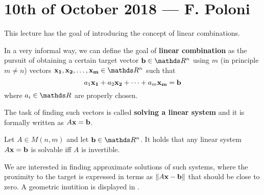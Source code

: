 \documentclass[computationalMathematics.tex]{subfiles}
\begin{document}
\chapter{10th of October 2018 --- F. Poloni}

This lecture has the goal of introducing the concept of linear combinations.

\begin{definition}
  In a very informal way, we can define the goal of \textbf{linear combination} as the pursuit of obtaining a certain target vector $\vect{b} \in \R^n$ using $m$ (in principle $m \neq n$) vectors $\vect{x_1}, \vect{x_2}, \ldots, \vect{x_m} \in \R^n$ such that
  \[
		a_1 {\bf x_1 } + a_2 {\bf x_2 } + \cdots + a_m {\bf x_m } = {\bf b }
  \]
  where $a_i \in \R$ are properly chosen.
\end{definition}

The task of finding such vectors is called \textbf{solving a linear system} and it is formally written as $A{\bf x }={\bf b }$.

\begin{theorem}
  Let $A \in M(n, m)$ and let $\vect{b} \in \R^n$.
  It holds that any linear system $A{\bf x }={\bf b }$ is solvable iff $A$ is invertible.
\end{theorem}

We are interested in finding approximate solutions of such systems, where the proximity to the target is expressed in terms as $\left\lVert A{\bf x } - {\bf b }\right\rVert$ that should be close to zero.
A geometric inutition is displayed in .


\end{document}
